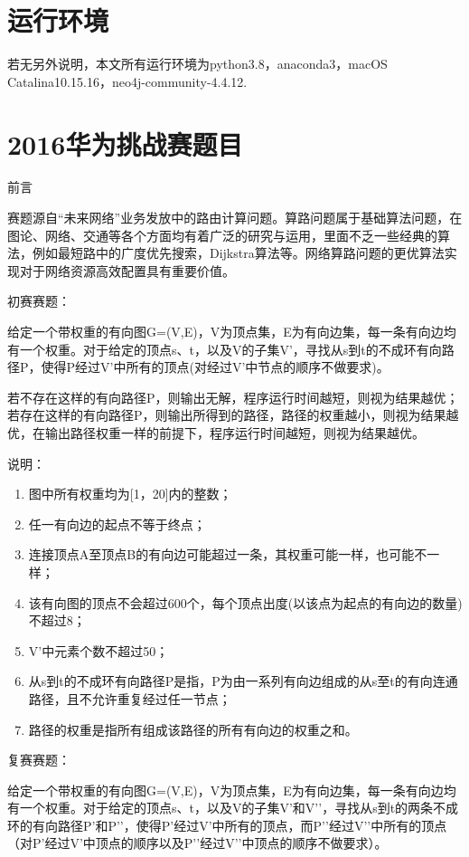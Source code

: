 \documentclass[12pt]{article}
\begin{document}
\section{运行环境}
若无另外说明，本文所有运行环境为python3.8，anaconda3，macOS Catalina10.15.16，neo4j-community-4.4.12.
\section{2016华为挑战赛题目}
前言

赛题源自“未来网络”业务发放中的路由计算问题。算路问题属于基础算法问题，在图论、网络、交通等各个方面均有着广泛的研究与运用，里面不乏一些经典的算法，例如最短路中的广度优先搜索，Dijkstra算法等。网络算路问题的更优算法实现对于网络资源高效配置具有重要价值。

初赛赛题：

给定一个带权重的有向图G=(V,E)，V为顶点集，E为有向边集，每一条有向边均有一个权重。对于给定的顶点s、t，以及V的子集V'，寻找从s到t的不成环有向路径P，使得P经过V'中所有的顶点(对经过V'中节点的顺序不做要求)。

若不存在这样的有向路径P，则输出无解，程序运行时间越短，则视为结果越优；若存在这样的有向路径P，则输出所得到的路径，路径的权重越小，则视为结果越优，在输出路径权重一样的前提下，程序运行时间越短，则视为结果越优。

说明：
\begin{enumerate}
	\item 图中所有权重均为[1，20]内的整数；
	\item 任一有向边的起点不等于终点；
	\item 连接顶点A至顶点B的有向边可能超过一条，其权重可能一样，也可能不一样；
	\item 该有向图的顶点不会超过600个，每个顶点出度(以该点为起点的有向边的数量)不超过8；
	\item V'中元素个数不超过50；
	\item 从s到t的不成环有向路径P是指，P为由一系列有向边组成的从s至t的有向连通路径，且不允许重复经过任一节点；
	\item 路径的权重是指所有组成该路径的所有有向边的权重之和。
\end{enumerate}
复赛赛题：

给定一个带权重的有向图G=(V,E)，V为顶点集，E为有向边集，每一条有向边均有一个权重。对于给定的顶点s、t，以及V的子集V’和V’’，寻找从s到t的两条不成环的有向路径P’和P’’，使得P’经过V’中所有的顶点，而P’’经过V’’中所有的顶点（对P’经过V’中顶点的顺序以及P’’经过V’’中顶点的顺序不做要求）。
\end{document}
